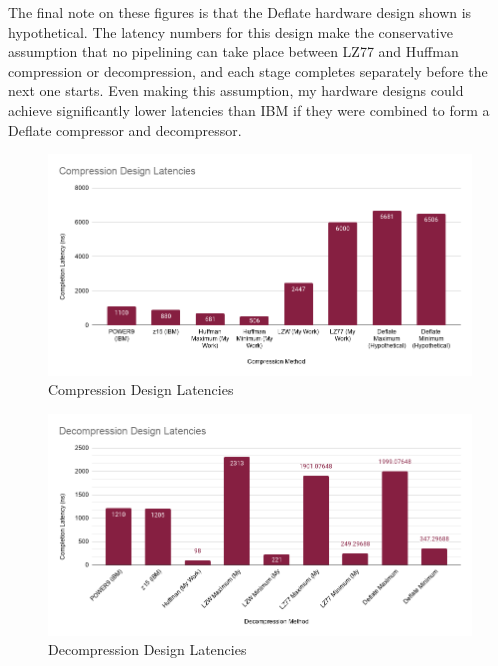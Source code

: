 \documentclass[doublespace,nopageskip]{VTthesis}
\begin{document}
The final note on these figures is that the Deflate hardware design shown is hypothetical. The latency numbers for this design make the conservative assumption that no pipelining can take place between LZ77 and Huffman compression or decompression, and each stage completes separately before the next one starts. Even making this assumption, my hardware designs could achieve significantly lower latencies than IBM if they were combined to form a Deflate compressor and decompressor.

\begin{figure}[htb]
	\centering
	\includegraphics[scale=0.5]{Compression Design Latencies.png}
	\caption{Compression Design Latencies}
	\label{fig:compression_design_latencies}
\end{figure}
\begin{figure}[htb]
	\centering
	\includegraphics[scale=0.5]{Decompression Design Latencies.png}
	\caption{Decompression Design Latencies}
	\label{fig:decompression_design_latencies}
\end{figure}

\end{document}
